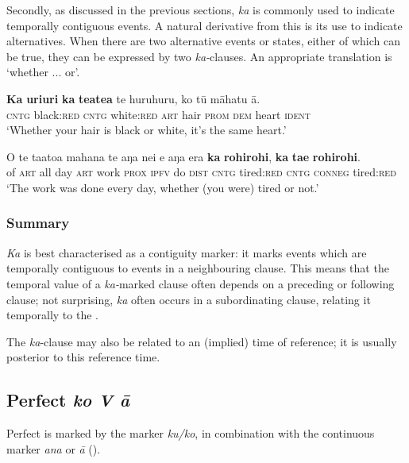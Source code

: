 Secondly, as discussed in the previous sections, \textit{ka} is commonly used to indicate temporally contiguous events. A natural derivative from this is its use to indicate alternatives. When there are two alternative events or states, either of which can be true, they can be expressed by two \textit{ka-}clauses. An appropriate translation is ‘whether ... or’.

\ea\label{ex:7.54}
\gll \textbf{Ka} \textbf{{\ꞌ}uri{\ꞌ}uri} \textbf{ka} \textbf{teatea} te huruhuru, ko tū māhatu {\ꞌ}ā. \\
\textsc{cntg} black:\textsc{red} \textsc{cntg} white:\textsc{red} \textsc{art} hair \textsc{prom} \textsc{dem} heart \textsc{ident} \\

\glt 
‘Whether your hair is black or white, it’s the same heart.’ \textstyleExampleref{[R211.078]} 
\z

\ea\label{ex:7.55}
\gll O te ta{\ꞌ}ato{\ꞌ}a mahana te aŋa nei e aŋa era \textbf{ka} \textbf{rohirohi},  \textbf{ka} \textbf{ta{\ꞌ}e} \textbf{rohirohi}.\\
of \textsc{art} all day \textsc{art} work \textsc{prox} \textsc{ipfv} do \textsc{dist} \textsc{cntg} tired:\textsc{red}  \textsc{cntg} \textsc{conneg} tired:\textsc{red}\\

\glt 
‘The work was done every day, whether (you were) tired or not.’ \textstyleExampleref{[R539-2.026]}
\z

\subsubsection{Summary}\label{sec:7.2.6.5}

\textit{Ka} is best characterised as a contiguity marker: it marks events which are temporally contiguous to events in a neighbouring clause. This means that the temporal value of a \textit{ka-}marked clause often depends on a preceding or following clause; not surprising, \textit{ka} often occurs in a subordinating clause, relating it temporally to the .

The \textit{ka}{}-clause may also be related to an (implied) time of reference; it is usually posterior to this reference time. 
\subsection{Perfect  \textit{ko V {\ꞌ}ā}}\label{sec:7.2.7}
Perfect  is marked by the  marker \textit{ku/ko}, in combination with the continuous marker \textit{{\ꞌ}ana} or \textit{{\ꞌ}ā} (). 

